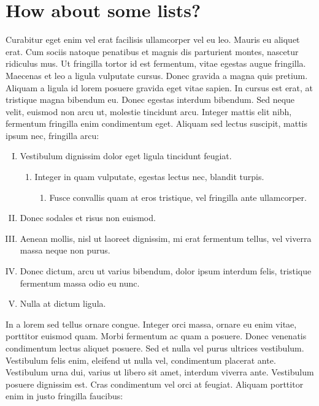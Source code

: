 \documentclass[10pt]{article}
\begin{document}
\section{How about some lists?}

Curabitur eget enim vel erat facilisis ullamcorper vel eu leo. Mauris eu aliquet erat. Cum sociis natoque penatibus et magnis dis parturient montes, nascetur ridiculus mus. Ut fringilla tortor id est fermentum, vitae egestas augue fringilla. Maecenas et leo a ligula vulputate cursus. Donec gravida a magna quis pretium. Aliquam a ligula id lorem posuere gravida eget vitae sapien. In cursus est erat, at tristique magna bibendum eu. Donec egestas interdum bibendum. Sed neque velit, euismod non arcu ut, molestie tincidunt arcu. Integer mattis elit nibh, fermentum fringilla enim condimentum eget. Aliquam sed lectus suscipit, mattis ipsum nec, fringilla arcu:

\begin{enumerate}[I.]
\item{Vestibulum dignissim dolor eget ligula tincidunt feugiat.
\begin{enumerate}
\item{Integer in quam vulputate, egestas lectus nec, blandit turpis.\begin{enumerate}
\item{Fusce convallis quam at eros tristique, vel fringilla ante ullamcorper.}
\end{enumerate}}
\end{enumerate}}
\item{Donec sodales et risus non euismod.}
\item{Aenean mollis, nisl ut laoreet dignissim, mi erat fermentum tellus, vel viverra massa neque non purus.}
\item{Donec dictum, arcu ut varius bibendum, dolor ipsum interdum felis, tristique fermentum massa odio eu nunc.}
\item{Nulla at dictum ligula.}
\end{enumerate}

In a lorem sed tellus ornare congue. Integer orci massa, ornare eu enim vitae, porttitor euismod quam. Morbi fermentum ac quam a posuere. Donec venenatis condimentum lectus aliquet posuere. Sed et nulla vel purus ultrices vestibulum. Vestibulum felis enim, eleifend ut nulla vel, condimentum placerat ante. Vestibulum urna dui, varius ut libero sit amet, interdum viverra ante. Vestibulum posuere dignissim est. Cras condimentum vel orci at feugiat. Aliquam porttitor enim in justo fringilla faucibus:
\end{document}
